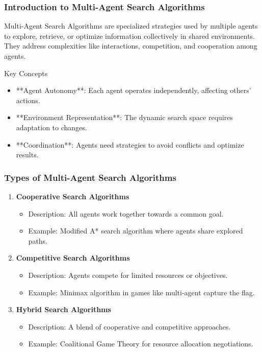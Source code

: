 \documentclass[aspectratio=169]{beamer}
\begin{document}
\begin{frame}[fragile]
    \frametitle{Introduction to Multi-Agent Search Algorithms}
    Multi-Agent Search Algorithms are specialized strategies used by multiple agents to explore, retrieve, or optimize information collectively in shared environments. They address complexities like interactions, competition, and cooperation among agents.

    \begin{block}{Key Concepts}
        \begin{itemize}
            \item **Agent Autonomy**: Each agent operates independently, affecting others' actions.
            \item **Environment Representation**: The dynamic search space requires adaptation to changes.
            \item **Coordination**: Agents need strategies to avoid conflicts and optimize results.
        \end{itemize}
    \end{block}
\end{frame}

\begin{frame}[fragile]
    \frametitle{Types of Multi-Agent Search Algorithms}
    \begin{enumerate}
        \item \textbf{Cooperative Search Algorithms}
            \begin{itemize}
                \item Description: All agents work together towards a common goal.
                \item Example: Modified A* search algorithm where agents share explored paths.
            \end{itemize}
        \item \textbf{Competitive Search Algorithms}
            \begin{itemize}
                \item Description: Agents compete for limited resources or objectives.
                \item Example: Minimax algorithm in games like multi-agent capture the flag.
            \end{itemize}
        \item \textbf{Hybrid Search Algorithms}
            \begin{itemize}
                \item Description: A blend of cooperative and competitive approaches.
                \item Example: Coalitional Game Theory for resource allocation negotiations.
            \end{itemize}
    \end{enumerate}
\end{frame}
\end{document}
